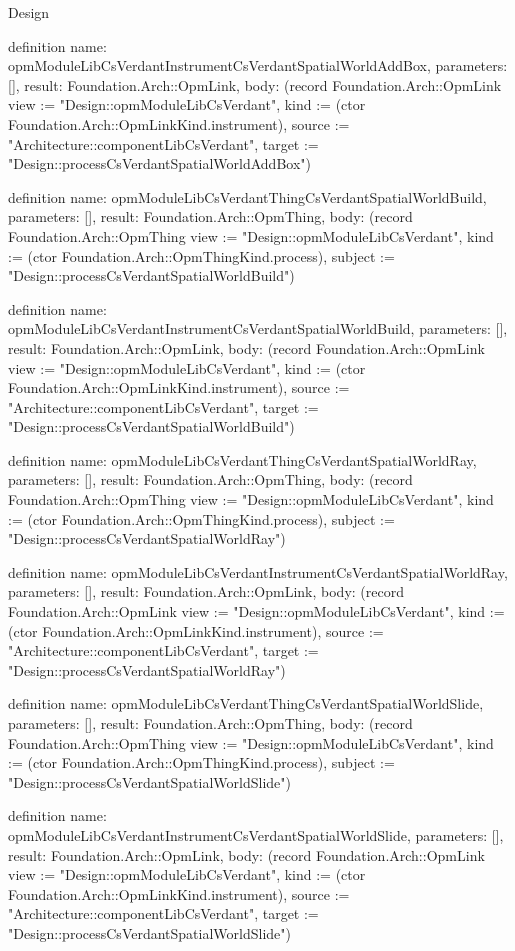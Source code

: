 \begin{lexlean}{Design}
\begin{semanticmodule}
definition{
  name: opmModuleLibCsVerdantInstrumentCsVerdantSpatialWorldAddBox,
  parameters: [],
  result: Foundation.Arch::OpmLink,
  body: (record Foundation.Arch::OpmLink {view := "Design::opmModuleLibCsVerdant", kind := (ctor Foundation.Arch::OpmLinkKind.instrument), source := "Architecture::componentLibCsVerdant", target := "Design::processCsVerdantSpatialWorldAddBox"})
}

definition{
  name: opmModuleLibCsVerdantThingCsVerdantSpatialWorldBuild,
  parameters: [],
  result: Foundation.Arch::OpmThing,
  body: (record Foundation.Arch::OpmThing {view := "Design::opmModuleLibCsVerdant", kind := (ctor Foundation.Arch::OpmThingKind.process), subject := "Design::processCsVerdantSpatialWorldBuild"})
}

definition{
  name: opmModuleLibCsVerdantInstrumentCsVerdantSpatialWorldBuild,
  parameters: [],
  result: Foundation.Arch::OpmLink,
  body: (record Foundation.Arch::OpmLink {view := "Design::opmModuleLibCsVerdant", kind := (ctor Foundation.Arch::OpmLinkKind.instrument), source := "Architecture::componentLibCsVerdant", target := "Design::processCsVerdantSpatialWorldBuild"})
}

definition{
  name: opmModuleLibCsVerdantThingCsVerdantSpatialWorldRay,
  parameters: [],
  result: Foundation.Arch::OpmThing,
  body: (record Foundation.Arch::OpmThing {view := "Design::opmModuleLibCsVerdant", kind := (ctor Foundation.Arch::OpmThingKind.process), subject := "Design::processCsVerdantSpatialWorldRay"})
}

definition{
  name: opmModuleLibCsVerdantInstrumentCsVerdantSpatialWorldRay,
  parameters: [],
  result: Foundation.Arch::OpmLink,
  body: (record Foundation.Arch::OpmLink {view := "Design::opmModuleLibCsVerdant", kind := (ctor Foundation.Arch::OpmLinkKind.instrument), source := "Architecture::componentLibCsVerdant", target := "Design::processCsVerdantSpatialWorldRay"})
}

definition{
  name: opmModuleLibCsVerdantThingCsVerdantSpatialWorldSlide,
  parameters: [],
  result: Foundation.Arch::OpmThing,
  body: (record Foundation.Arch::OpmThing {view := "Design::opmModuleLibCsVerdant", kind := (ctor Foundation.Arch::OpmThingKind.process), subject := "Design::processCsVerdantSpatialWorldSlide"})
}

definition{
  name: opmModuleLibCsVerdantInstrumentCsVerdantSpatialWorldSlide,
  parameters: [],
  result: Foundation.Arch::OpmLink,
  body: (record Foundation.Arch::OpmLink {view := "Design::opmModuleLibCsVerdant", kind := (ctor Foundation.Arch::OpmLinkKind.instrument), source := "Architecture::componentLibCsVerdant", target := "Design::processCsVerdantSpatialWorldSlide"})
}


\end{semanticmodule}
\end{lexlean}
